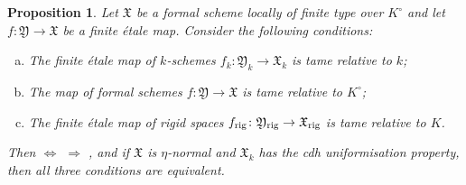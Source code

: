 \documentclass[a4paper,twoside,11pt,reqno]{amsart}
\newcommand{\fX}{{\mathfrak{X}}}
\newcommand{\fY}{{\mathfrak{Y}}}
\newcommand{\rig}{{\rm rig}}
\newtheorem{prop}[thm]{Proposition}
\theoremstyle{definition}
\numberwithin{equation}{subsection}
\begin{document}
\begin{prop} \label{prop:tameness-comparison-etale}
    Let $\fX$ be a formal scheme locally of finite type over $K^\circ$ and let $f \colon \fY\to \fX$ be a finite \'etale map.
    Consider the following conditions:
    \begin{enumerate}[(a)]
        \item \label{propitem:tameness-comparison-etale-a} The finite \'etale map of $k$-schemes $f_k \colon \fY_k\to\fX_k$ is tame relative to $k$;
        \item \label{propitem:tameness-comparison-etale-b}The map of formal schemes $f \colon \fY\to\fX$ is tame relative to $K^\circ$;
        \item \label{propitem:tameness-comparison-etale-c} The finite \'etale map of rigid spaces $f_\rig \colon \fY_{\rm rig}\to\fX_{\rm rig}$ is tame relative to $K$.
    \end{enumerate}
    Then  $\Leftrightarrow$  $\Rightarrow$ , and if $\fX$ is $\eta$-normal and $\fX_k$ has the cdh uniformisation property, then all three conditions are equivalent.
\end{prop}
\end{document}
